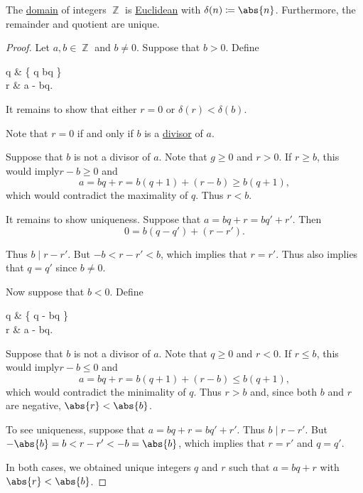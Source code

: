 \begin{proposition}\label{thm:integers_are_euclidean_domain}
  The \hyperref[def:semiring/integral_domain]{domain} of integers \( \BbbZ \) is \hyperref[def:semiring/euclidean_domain]{Euclidean} with \( \delta(n) \coloneqq \abs{n} \). Furthermore, the remainder and quotient are unique.
\end{proposition}
\begin{proof}
  Let \( a, b \in \BbbZ \) and \( b \neq 0 \). Suppose that \( b > 0 \). Define
  \begin{balign*}
    q & \coloneqq \max \{ q \in \BbbZ \colon bq \leq {} \} \\
    r & \coloneqq a - bq.
  \end{balign*}

  It remains to show that either \( r = 0 \) or \( \delta(r) < \delta(b) \).

  Note that \( r = 0 \) if and only if \( b \) is a \hyperref[def:commutative_ring_division]{divisor} of \( a \).

  Suppose that \( b \) is not a divisor of \( a \). Note that \( g \geq 0 \) and \( r > 0 \). If \( r \geq b \), this would imply\LEM \( r - b \geq 0 \) and
  \begin{equation*}
    a = bq + r = b(q + 1) + (r - b) \geq b(q + 1),
  \end{equation*}
  which would contradict the maximality of \( q \). Thus \( r < b \).

  It remains to show uniqueness. Suppose that \( a = bq + r = bq' + r' \). Then
  \begin{equation*}
    0 = b(q - q') + (r - r').
  \end{equation*}

  Thus \( b \mid r - r' \). But \( -b < r - r' < b \), which implies that \( r = r' \). Thus also implies that \( q = q' \) since \( b \neq 0 \).

  Now suppose that \( b < 0 \). Define
  \begin{balign*}
    q & \coloneqq \min \{ q \in \BbbZ \colon - \leq bq \} \\
    r & \coloneqq a - bq.
  \end{balign*}

  Suppose that \( b \) is not a divisor of \( a \). Note that \( q \geq 0 \) and \( r < 0 \). If \( r \leq b \), this would imply\LEM \( r - b \leq 0 \) and
  \begin{equation*}
    a = bq + r = b(q + 1) + (r - b) \leq b(q + 1),
  \end{equation*}
  which would contradict the minimality of \( q \). Thus \( r > b \) and, since both \( b \) and \( r \) are negative, \( \abs{r} < \abs{b} \).

  To see uniqueness, suppose that \( a = bq + r = bq' + r' \). Thus \( b \mid r - r' \). But \( -\abs{b} = b < r - r' < -b = \abs{b} \), which implies that \( r = r' \) and \( q = q' \).

  In both cases, we obtained unique integers \( q \) and \( r \) such that \( a = bq + r \) with \( \abs{r} < \abs{b} \).
\end{proof}

